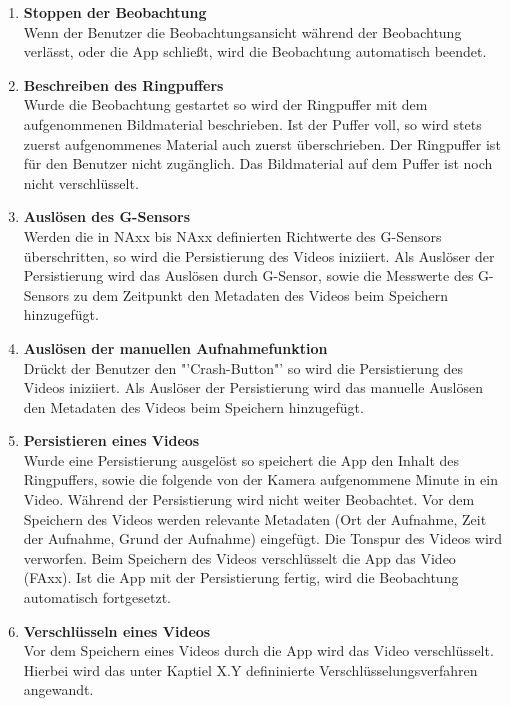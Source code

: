 \begin{enumerate}[\bfseries{FA}10]
\item \textbf{Stoppen der Beobachtung} \hfill \\
Wenn der Benutzer die Beobachtungsansicht während der Beobachtung verlässt, oder die App schließt, wird die Beobachtung automatisch beendet.

\item \textbf{Beschreiben des Ringpuffers} \hfill \\
Wurde die Beobachtung gestartet so wird der Ringpuffer mit dem aufgenommenen Bildmaterial beschrieben. Ist der Puffer voll, so wird stets zuerst aufgenommenes Material auch zuerst überschrieben. Der Ringpuffer ist für den Benutzer nicht zugänglich. Das Bildmaterial auf dem Puffer ist noch nicht verschlüsselt.

\item \textbf{Auslösen des G-Sensors} \hfill \\
Werden die in NAxx bis NAxx definierten Richtwerte des G-Sensors überschritten, so wird die Persistierung des Videos iniziiert. Als Auslöser der Persistierung wird das Auslösen durch G-Sensor, sowie die Messwerte des G-Sensors zu dem Zeitpunkt den Metadaten des Videos beim Speichern hinzugefügt.

\item \textbf{Auslösen der manuellen Aufnahmefunktion} \hfill \\
Drückt der Benutzer den "'Crash-Button"' so wird die Persistierung des Videos iniziiert. Als Auslöser der Persistierung wird das manuelle Auslösen den Metadaten des Videos beim Speichern hinzugefügt.

\item \textbf{Persistieren eines Videos} \hfill \\
Wurde eine Persistierung ausgelöst so speichert die App den Inhalt des Ringpuffers, sowie die folgende von der Kamera aufgenommene Minute in ein Video. Während der Persistierung wird nicht weiter Beobachtet. Vor dem Speichern des Videos werden relevante Metadaten (Ort der Aufnahme, Zeit der Aufnahme, Grund der Aufnahme) eingefügt. Die Tonspur des Videos wird verworfen. Beim Speichern des Videos verschlüsselt die App das Video (FAxx). Ist die App mit der Persistierung fertig, wird die Beobachtung automatisch fortgesetzt.

\item \textbf{Verschlüsseln eines Videos} \hfill \\
Vor dem Speichern eines Videos durch die App wird das Video verschlüsselt. Hierbei wird das unter Kaptiel X.Y defininierte Verschlüsselungsverfahren angewandt.


\end{enumerate}
